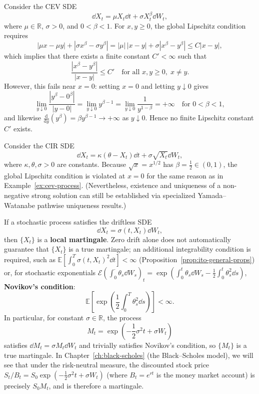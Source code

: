 \begin{example}
\label{ex:cev-process}
Consider the CEV SDE
\[
\dd X_t = \mu X_t \dd t + \sigma X_t^{\beta}\dd W_t,
\]
where $\mu \in \mathbb{R}$, $\sigma > 0$, and $0 < \beta < 1$. For $x, y \ge 0$, the global Lipschitz condition requires
\[
|\mu x - \mu y| + |\sigma x^\beta - \sigma y^\beta| = |\mu|\,|x - y| + \sigma |x^\beta - y^\beta| \le C |x - y|,
\]
which implies that there exists a finite constant $C' < \infty$ such that
\[
\frac{|x^\beta - y^\beta|}{|x - y|} \le C' \quad \text{for all } x, y \ge 0,\; x \neq y.
\]
However, this fails near $x = 0$: setting $x = 0$ and letting $y \downarrow 0$ gives
\[
\lim_{y \downarrow 0} \frac{|y^\beta - 0^\beta|}{|y - 0|} = \lim_{y \downarrow 0} y^{\beta - 1} = \lim_{y \downarrow 0} \frac{1}{y^{1-\beta}} = +\infty \quad \text{for } 0 < \beta < 1,
\]
and likewise $\frac{\mathrm{d}}{\mathrm{d}y}(y^\beta) = \beta y^{\beta - 1} \to +\infty$ as $y \downarrow 0$. Hence no finite Lipschitz constant $C'$ exists.
\end{example}

\begin{example}
\label{ex:cir-process}
Consider the CIR SDE
\[
\dd X_t = \kappa(\theta - X_t)\dd t + \sigma \sqrt{X_t}\dd W_t,
\]
where $\kappa, \theta, \sigma > 0$ are constants. Because $\sqrt{x} = x^{1/2}$ has $\beta = \frac{1}{2} \in (0, 1)$, the global Lipschitz condition is violated at $x = 0$ for the same reason as in Example~\ref{ex:cev-process}. (Nevertheless, existence and uniqueness of a non-negative strong solution can still be established via specialized Yamada--Watanabe pathwise uniqueness results.)
\end{example}

\begin{remark}
\label{rem:local-martingale}
If a stochastic process satisfies the driftless SDE
\[
\dd X_t = \sigma(t, X_t)\dd W_t,
\]
then $\{X_t\}$ is a \textbf{local martingale}. Zero drift alone does not automatically guarantee that $\{X_t\}$ is a true martingale; an additional integrability condition is required, such as $\mathbb{E}\left[\int_0^T \sigma(t, X_t)^2 \dd t\right] < \infty$ (Proposition~\ref{prop:ito-general-props}) or, for stochastic exponentials $\mathcal{E}\!\left(\int_0^\cdot \theta_s \dd W_s\right)_t = \exp\!\left(\int_0^t \theta_s \dd W_s - \frac{1}{2}\int_0^t \theta_s^2 \dd s\right)$, \textbf{Novikov's condition}:
\[
\mathbb{E}\left[\exp\left(\frac{1}{2}\int_0^T \theta_s^2 \dd s\right)\right] < \infty.
\]
In particular, for constant $\sigma \in \mathbb{R}$, the process
\[
M_t = \exp\left(-\frac{1}{2}\sigma^2 t + \sigma W_t\right)
\]
satisfies $\dd M_t = \sigma M_t \dd W_t$ and trivially satisfies Novikov's condition, so $\{M_t\}$ is a true martingale. In Chapter~\ref{ch:black-scholes} (the Black--Scholes model), we will see that under the risk-neutral measure, the discounted stock price $S_t / B_t = S_0 \exp\left(-\frac{1}{2}\sigma^2 t + \sigma W_t\right)$ (where $B_t = e^{r t}$ is the money market account) is precisely $S_0 M_t$, and is therefore a martingale.
\end{remark}

